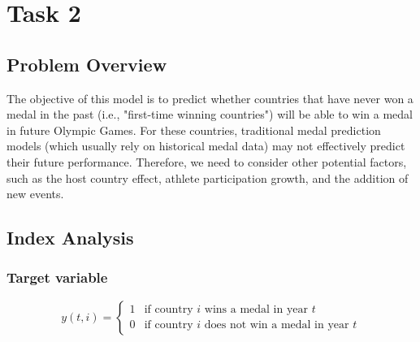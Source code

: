 \documentclass{mcmthesis}
\begin{document}
%


	
	\section{Task 2}
	
	
	\subsection{Problem Overview}
	The objective of this model is to predict whether countries that have never won a medal in the past (i.e., "first-time winning countries") will be able to win a medal in future Olympic Games. For these countries, traditional medal prediction models (which usually rely on historical medal data) may not effectively predict their future performance. Therefore, we need to consider other potential factors, such as the host country effect, athlete participation growth, and the addition of new events.
	
	
	\subsection{Index Analysis}
	
	
	\subsubsection{Target variable}
	\[
	y(t,i) = 
	\begin{cases} 
		1 & \text{if country } i \text{ wins a medal in year } t \\ 
		0 & \text{if country } i \text{ does not win a medal in year } t 
	\end{cases}
	\]
\end{document}
